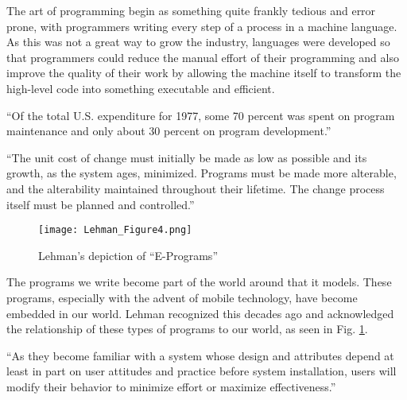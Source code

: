 \documentclass[12pt,letterpaper]{report}
\begin{document}
\cleardoublepage%
{}


The art of programming begin as something quite frankly tedious and error prone, with programmers writing every step of a process in a machine language. As this was not a great way to grow the industry, languages were developed so that programmers could reduce the manual effort of their programming and also improve the quality of their work by allowing the machine itself to transform the high-level code into something executable and efficient. \cite{lehman:1980}

``Of the total U.S. expenditure for 1977, some 70 percent was spent on program maintenance and only about 30 percent on program development.'' \cite{lehman:1980}

``The unit cost of change must initially be made as low as possible and its growth, as the system ages, minimized. Programs must be made more alterable, and the alterability maintained throughout their lifetime. The change process itself must be planned and controlled.'' \cite{lehman:1980}

\begin{figure}[ht]
  \centerline{
      \texttt{[image: Lehman\_Figure4.png]}
  }
  \caption{Lehman's depiction of ``E-Programs'' \cite{lehman:1980}}
  \label{figEPrograms}
\end{figure}

The programs we write become part of the world around that it models. These programs, especially with the advent of mobile technology, have become embedded in our world. Lehman recognized this decades ago and acknowledged the relationship of these types of programs to our world, as seen in Fig. \ref{figEPrograms}. \cite{lehman:1980}

``As they become familiar with a system whose design and attributes depend at least in part on user attitudes and practice before system installation, users will modify their behavior to minimize effort or maximize effectiveness.'' \cite{lehman:1980}


\newpage



\end{document}
